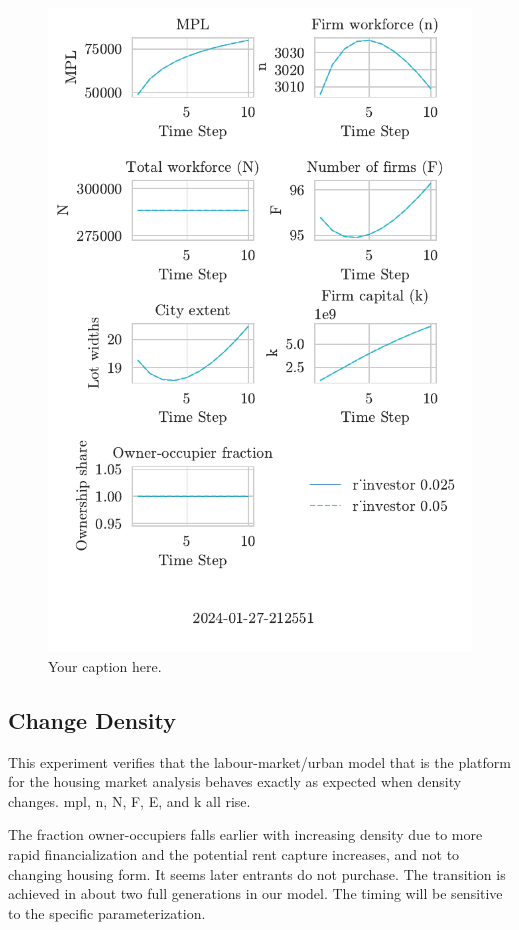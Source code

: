 \begin{figure}
  \centering
  \includegraphics[width=.6\textwidth, clip, trim=0 20mm 0 0]{fig/plots/timeseries-plots-2024-01-27-212551.pdf}
  \caption{Your caption here.}
  \label{fig:your-label}
\end{figure}

 \subsection{Change Density}
 This experiment verifies that the labour-market/urban model that is the platform for the housing market analysis behaves exactly as expected when density changes. mpl, n, N, F, E, and k all rise. %

 The fraction owner-occupiers falls earlier with increasing density due to more rapid financialization and the potential rent capture increases, and not to changing housing form. It seems later entrants do not purchase. The transition is achieved in about two full generations in our model. The timing will be sensitive to the specific parameterization.
 

